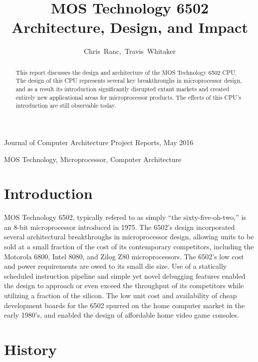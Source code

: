\documentclass[journal]{IEEEtran}
\begin{document}
\title{MOS Technology 6502 \\ Architecture, Design, and Impact}

\author{Chris~Ranc,~Travis~Whitaker}

{Journal of Computer Architecture Project Reports, May 2016}

\maketitle

\begin{abstract}
This report discusses the design and architecture of the MOS Technology 6502
CPU. The design of this CPU represents several key breakthroughs in
microprocessor design, and as a result its introduction significantly disrupted
extant markets and created entirely new applicational areas for microprocessor
products. The effects of this CPU's introduction are still observable today.
\end{abstract}

\begin{IEEEkeywords}
MOS Technology, Microprocessor, Computer Architecture
\end{IEEEkeywords}

\IEEEpeerreviewmaketitle

\section{Introduction}

 MOS Technology 6502, typically refered to as simply
``the sixty-five-oh-two,'' is an 8-bit microprocessor introduced in 1975. The
6502's design incorporated several architectural breakthroughs in microprocessor
design, allowing units to be sold at a small fraction of the cost of its
contemporary competitors, including the Motorola 6800, Intel 8080, and Zilog Z80
microprocessors. The 6502's low cost and power requirements are owed to its
small die size. Use of a statically scheduled instruction pipeline and simple
yet novel debugging features enabled the design to approach or even exceed the
throughput of its competitors while utilizing a fraction of the silicon. The low
unit cost and availability of cheap development boards for the 6502 spurred on
the home computer market in the early 1980's, and enabled the design of
affordable home video game consoles.


\section{History}
\end{document}
